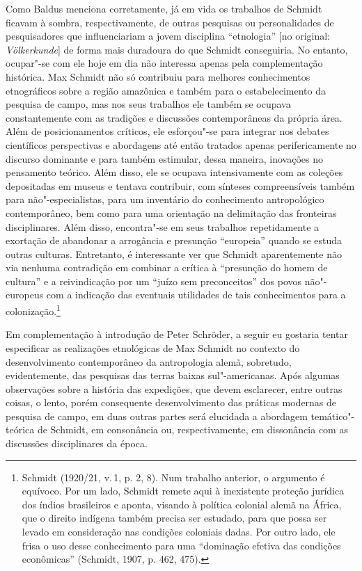 Como Baldus menciona corretamente, já em vida os trabalhos de Schmidt
ficavam à sombra, respectivamente, de outras pesquisas ou personalidades
de pesquisadores que influenciariam a jovem disciplina ``etnologia''
{[}no original: \emph{Völkerkunde}{]} de forma mais duradoura do que
Schmidt conseguiria. No entanto, ocupar"-se com ele hoje em dia não
interessa apenas pela complementação histórica. Max Schmidt não só
contribuiu para melhores conhecimentos etnográficos sobre a região
amazônica e também para o estabelecimento da pesquisa de campo, mas nos
seus trabalhos ele também se ocupava constantemente com as tradições e
discussões contemporâneas da própria área. Além de posicionamentos
críticos, ele esforçou"-se para integrar nos debates científicos
perspectivas e abordagens até então tratados apenas perifericamente no
discurso dominante e para também estimular, dessa maneira, inovações no
pensamento teórico. Além disso, ele se ocupava intensivamente com as
coleções depositadas em museus e tentava contribuir, com sínteses
compreensíveis também para não"-especialistas, para um inventário do
conhecimento antropológico contemporâneo, bem como para uma orientação
na delimitação das fronteiras disciplinares. Além disso, encontra"-se em
seus trabalhos repetidamente a exortação de abandonar a arrogância e
presunção ``europeia'' quando se estuda outras culturas. Entretanto, é
interessante ver que Schmidt aparentemente não via nenhuma contradição
em combinar a crítica à ``presunção do homem de cultura'' e a
reivindicação por um ``juízo sem preconceitos'' dos povos não"-europeus
com a indicação das eventuais utilidades de tais conhecimentos para a
colonização.\footnote{Schmidt (1920/21, v.\,1, p. 2, 8). Num trabalho
  anterior, o argumento é equívoco. Por um lado, Schmidt remete aqui à
  inexistente proteção jurídica dos índios brasileiros e aponta,
  visando à política colonial alemã na África, que o direito indígena
  também precisa ser estudado, para que possa ser levado em consideração
  nas condições coloniais dadas. Por outro lado, ele frisa o uso desse
  conhecimento para uma ``dominação efetiva das condições econômicas''
  (Schmidt, 1907, p. 462, 475).}

Em complementação à introdução de Peter Schröder, a seguir eu gostaria
tentar especificar as realizações etnológicas de Max Schmidt no contexto
do desenvolvimento contemporâneo da antropologia alemã, sobretudo,
evidentemente, das pesquisas das terras baixas sul"-americanas. Após
algumas observações sobre a história das expedições, que devem
esclarecer, entre outras coisas, o lento, porém consequente
desenvolvimento das práticas modernas de pesquisa de campo, em duas
outras partes será elucidada a abordagem temático"-teórica de Schmidt, em
consonância ou, respectivamente, em dissonância com as discussões
disciplinares da época.

